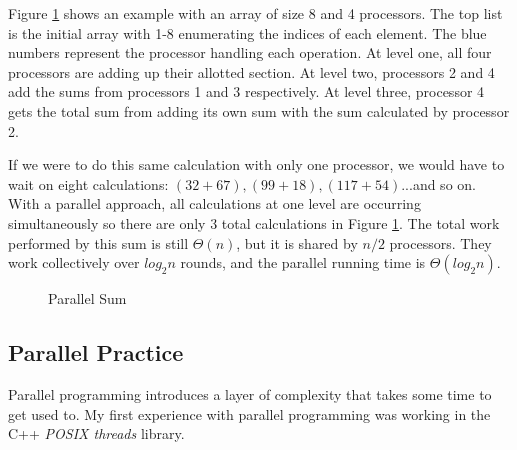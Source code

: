 \documentclass[12pt,twoside]{reedthesis}
\begin{document}
Figure \ref{fig:p_sum} shows an example with an array of size 8 and 4 processors. The top list is the initial array with 1-8 enumerating the indices of each element. The blue numbers represent the processor handling each operation. At level one, all four processors are adding up their allotted section. At level two, processors 2 and 4 add the sums from processors 1 and 3 respectively. At level three, processor 4 gets the total sum from adding its own sum with the sum calculated by processor 2.

If we were to do this same calculation with only one processor, we would have to wait on eight calculations: $(32+67), (99+18), (117+54)$...and so on. With a parallel approach, all calculations at one level are occurring simultaneously so there are only 3 total calculations in Figure \ref{fig:p_sum}. The total work performed by this sum is still $\Theta(n)$, but it is shared by $n/2$ processors. They work collectively over $log_2n$ rounds, and the parallel running time is $\Theta(log_2n)$.

\begin{figure}[h]
	\centering
	\caption{Parallel Sum}
	\label{fig:p_sum}
\end{figure}

\subsection{Parallel Practice}

Parallel programming introduces a layer of complexity that takes some time to get used to. My first experience with parallel programming was working in the C++ \textit{POSIX threads} library. 
\end{document}
